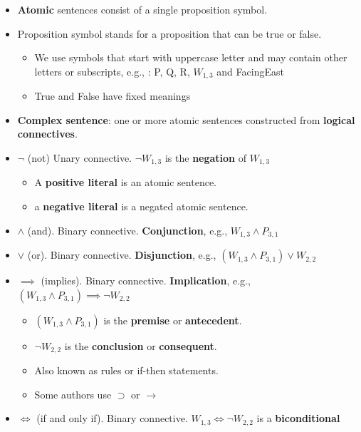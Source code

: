 \documentclass[11pt]{article}
\begin{document}
\begin{itemize}
\item \textbf{Atomic} sentences consist of a single proposition symbol.
\item Proposition symbol stands for a proposition that can be true or false.

\begin{itemize}
\item We use symbols that start with uppercase letter and may contain other letters or subscripts, e.g., : P, Q, R, \(W_{1,3}\) and FacingEast
\item True and False have fixed meanings
\end{itemize}

\item \textbf{Complex sentence}: one or more atomic sentences constructed from \textbf{logical connectives}.

\item \(\neg\) (not) Unary connective.  \(\neg W_{1,3}\) is the \textbf{negation} of \(W_{1,3}\)

\begin{itemize}
\item A \textbf{positive literal} is an atomic sentence.
\item a \textbf{negative literal} is a negated atomic sentence.
\end{itemize}

\item \(\land\) (and).  Binary connective.  \textbf{Conjunction}, e.g., \(W_{1,3} \land P_{3,1}\)

\item \(\lor\) (or).  Binary connective.  \textbf{Disjunction}, e.g., \((W_{1,3} \land P_{3,1}) \lor W_{2,2}\)

\item \(\implies\) (implies).  Binary connective.  \textbf{Implication}, e.g., \((W_{1,3} \land P_{3,1}) \implies \neg W_{2,2}\)

\begin{itemize}
\item \((W_{1,3} \land P_{3,1})\) is the \textbf{premise} or \textbf{antecedent}.
\item \(\neg W_{2,2}\) is the \textbf{conclusion} or \textbf{consequent}.
\item Also known as rules or if-then statements.
\item Some authors use \(\supset\) or \(\rightarrow\)
\end{itemize}

\item \(\iff\) (if and only if).  Binary connective. \(W_{1,3} \iff \neg W_{2,2}\) is a \textbf{biconditional}
\end{itemize}
\end{document}
